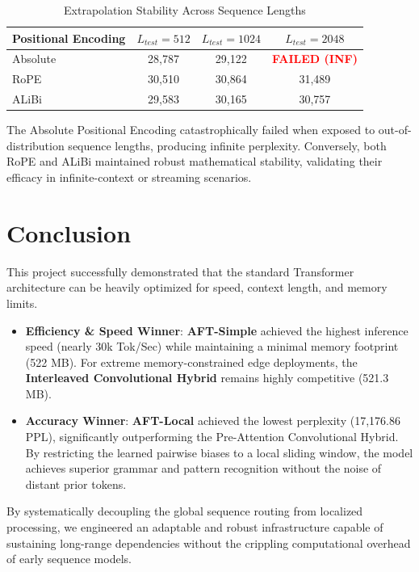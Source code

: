 \documentclass[11pt,a4paper]{article}
\begin{document}
\begin{table}[h]
    \centering
    \caption{Extrapolation Stability Across Sequence Lengths}
    \begin{tabular}{lccc}
        \toprule
        \textbf{Positional Encoding} & $L_{test} = 512$ & $L_{test} = 1024$ & $L_{test} = 2048$ \\
        \midrule
        Absolute & 28,787 & 29,122 & \textcolor{red}{\textbf{FAILED (INF)}} \\
        RoPE & 30,510 & 30,864 & 31,489 \\
        ALiBi & 29,583 & 30,165 & 30,757 \\
        \bottomrule
    \end{tabular}
    \label{tab:extrapolation}
\end{table}

The Absolute Positional Encoding catastrophically failed when exposed to out-of-distribution sequence lengths, producing infinite perplexity. Conversely, both RoPE and ALiBi maintained robust mathematical stability, validating their efficacy in infinite-context or streaming scenarios.

\section{Conclusion}

This project successfully demonstrated that the standard Transformer architecture can be heavily optimized for speed, context length, and memory limits. 

\begin{itemize}
    \item \textbf{Efficiency \& Speed Winner}: \textbf{AFT-Simple} achieved the highest inference speed (nearly 30k Tok/Sec) while maintaining a minimal memory footprint (522 MB). For extreme memory-constrained edge deployments, the \textbf{Interleaved Convolutional Hybrid} remains highly competitive (521.3 MB).
    \item \textbf{Accuracy Winner}: \textbf{AFT-Local} achieved the lowest perplexity (17,176.86 PPL), significantly outperforming the Pre-Attention Convolutional Hybrid. By restricting the learned pairwise biases to a local sliding window, the model achieves superior grammar and pattern recognition without the noise of distant prior tokens.
\end{itemize}

By systematically decoupling the global sequence routing from localized processing, we engineered an adaptable and robust infrastructure capable of sustaining long-range dependencies without the crippling computational overhead of early sequence models.
\end{document}
